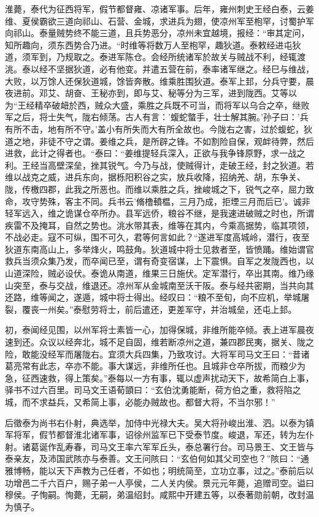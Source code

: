 \documentclass[12pt,UTF8]{ctexbook}
\begin{document}
淮薨，泰代为征西将军，假节都督雍、凉诸军事。后年，雍州刺史王经白泰，云姜维、夏侯霸欲三道向祁山、石营、金城，求进兵为翅，使凉州军至枹罕，讨蜀护军向祁山。泰量贼势终不能三道，且兵势恶分，凉州未宜越境，报经：“审其定问，知所趣向，须东西势合乃进。“时维等将数万人至枹罕，趣狄道。泰敕经进屯狄道，须军到，乃规取之。泰进军陈仓。会经所统诸军於故关与贼战不利，经辄渡洮。泰以经不坚据狄道，必有他变。并遣五营在前，泰率诸军继之。经巳与维战，大败，以万馀人还保狄道城，馀皆奔散。维乘胜围狄道。泰军上邽，分兵守要，晨夜进前。邓艾、胡奋、王秘亦到，即与艾、秘等分为三军，进到陇西。艾等以为“王经精卒破衄於西，贼众大盛，乘胜之兵既不可当，而将军以乌合之卒，继败军之后，将士失气，陇右倾荡。古人有言：'蝮蛇螫手，壮士解其腕。'孙子曰：'兵有所不击，地有所不守。'盖小有所失而大有所全故也。今陇右之害，过於蝮蛇，狄道之地，非徒不守之谓。姜维之兵，是所辟之锋。不如割险自保，观衅待弊，然后进救，此计之得者也。“泰曰：“姜维提轻兵深入，正欲与我争锋原野，求一战之利。王经当高壁深垒，挫其锐气。今乃与战，使贼得计，走破王经，封之狄道。若维以战克之威，进兵东向，据栎阳积谷之实，放兵收降，招纳羌、胡，东争关、陇，传檄四郡，此我之所恶也。而维以乘胜之兵，挫峻城之下，锐气之卒，屈力致命，攻守势殊，客主不同。兵书云'脩橹轒榅，三月乃成，拒堙三月而后已'。诚非轻军远入，维之诡谋仓卒所办。县军远侨，粮谷不继，是我速进破贼之时也，所谓疾雷不及掩耳，自然之势也。洮水带其表，维等在其内，今乘高据势，临其项领，不战必走。寇不可纵，围不可久，君等何言如此？“遂进军度高城岭，潜行，夜至狄道东南高山上，多举烽火，鸣鼓角。狄道城中将士见救者至，皆愤踊。维始谓官救兵当须众集乃发，而卒闻已至，谓有奇变宿谋，上下震惧。自军之发陇西也，以山道深险，贼必设伏。泰诡从南道，维果三日施伏。定军潜行，卒出其南。维乃缘山突至，泰与交战，维退还。凉州军从金城南至沃干阪。泰与经共密期，当共向其还路，维等闻之，遂遁，城中将士得出。经叹曰：“粮不至旬，向不应机，举城屠裂，覆丧一州矣。”泰慰劳将士，前后遣还，更差军守，并治城垒，还屯上邽。

初，泰闻经见围，以州军将士素皆一心，加得保城，非维所能卒倾。表上进军晨夜速到还。众议以经奔北，城不足自固，维若断凉州之道，兼四郡民夷，据关、陇之险，敢能没经军而屠陇右。宜须大兵四集，乃致攻讨。大将军司马文王曰：“昔诸葛亮常有此志，卒亦不能。事大谋远，非维所任也。且城非仓卒所拔，而粮少为急，征西速救，得上策矣。”泰每以一方有事，辄以虚声扰动天下，故希简白上事，驿书不过六百里。司马文王语荀顗曰：“玄伯沈勇能断，荷方伯之重，救将陷之城，而不求益兵，又希简上事，必能办贼故也。都督大将，不当尔邪！”

后徵泰为尚书右仆射，典选举，加侍中光禄大夫。吴大将孙峻出淮、泗。以泰为镇军将军，假节都督淮北诸军事，诏徐州监军已下受泰节度。峻退，军还，转为左仆射。诸葛诞作乱寿春，司马文王率六军军丘头，泰总署行台。司马景王、文王皆与泰亲友，及沛国武陔亦与泰善。文王问陔曰：“玄伯何如其父司空也？”陔曰：“通雅博畅，能以天下声教为己任者，不如也；明统简至，立功立事，过之。”泰前后以功增邑二千六百户，赐子弟一人亭侯，二人关内侯。景元元年薨，追赠司空。谥曰穆侯。子恂嗣。恂薨，无嗣，弟温绍封。咸熙中开建五等，以泰著勋前朝，改封温为慎子。
\end{document}
